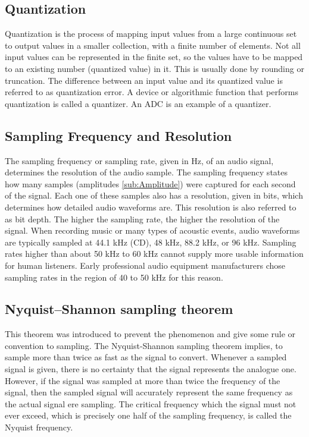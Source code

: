 \subsection{Quantization}
\label{sub:Quantization}

Quantization is the process of mapping input values from a large continuous set to output values in a smaller collection, with a finite number of elements. Not all input values can be represented in the finite set, so the values have to be mapped to an existing number (quantized value) in it. This is usually done by rounding or truncation. The difference between an input value and its quantized value is referred to as quantization error. A device or algorithmic function that performs quantization is called a quantizer. An \gls{ADC} is an example of a quantizer.

\subsection{Sampling Frequency and Resolution}
\label{sub:Sampling-Frequency-Resolution}

The sampling frequency or sampling rate, given in \gls{Hz}, of an audio signal, determines the resolution of the audio sample. The sampling frequency states how many samples (amplitudes \ref{sub:Amplitude}) were captured for each second of the signal. Each one of these samples also has a resolution, given in bits, which determines how detailed audio waveforms are. This resolution is also referred to as bit depth. The higher the sampling rate, the higher the resolution of the signal. When recording music or many types of acoustic events, audio waveforms are typically sampled at 44.1 \gls{kHz} (CD), 48 \gls{kHz}, 88.2 \gls{kHz}, or 96 \gls{kHz}. Sampling rates higher than about 50 \gls{kHz} to 60 \gls{kHz} cannot supply more usable information for human listeners. Early professional audio equipment manufacturers chose sampling rates in the region of 40 to 50 \gls{kHz} for this reason.

\subsection{Nyquist–Shannon sampling theorem}
\label{sub:Nyquist–Shannon}

This theorem was introduced to prevent the  phenomenon and give some rule or convention to sampling. The Nyquist-Shannon sampling theorem implies, to sample more than twice as fast as the signal to convert.
\newline
\newline
Whenever a sampled signal is given, there is no certainty that the signal represents the analogue one. However, if the signal was sampled at more than twice the frequency of the signal, then the sampled signal will accurately represent the same frequency as the actual signal ere sampling. The critical frequency which the signal must not ever exceed, which is precisely one half of the sampling frequency, is called the Nyquist frequency.

